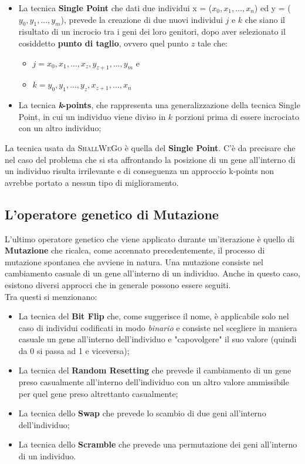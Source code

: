         \begin{itemize}
            \item La tecnica \textbf{Single Point} che dati due individui x = ($x_{0}, x_{1}, ..., x_{n}$) ed y = ($y_{0}, y_{1}, ..., y_{m}$), prevede la creazione di due nuovi individui $j$ e $k$ che siano il risultato di un incrocio tra i geni dei loro genitori, dopo aver selezionato il cosiddetto \textbf{punto di taglio}, ovvero quel punto $z$ tale che:
                \begin{itemize}
                    \item $j = x_{0}, x_{1}, ..., x_{z}, y_{z+1}, ..., y_{m}$ e
                    \item $k = y_{0}, y_{1}, ..., y_{z}, x_{z+1}, ..., x_{n}$
                \end{itemize}
            \item La tecnica \textbf{\textit{k}-points}, che rappresenta una generalizzazione della tecnica Single Point, in cui un individuo viene diviso in \textit{$k$} porzioni prima di essere incrociato con un altro individuo;
        \end{itemize}
        La tecnica usata da \textsc{ShallWeGo} è quella del \textbf{Single Point}. C'è da precisare che nel caso del problema che si sta affrontando la posizione di un gene all'interno di un individuo risulta irrilevante e di conseguenza un approccio k-points non avrebbe portato a nessun tipo di miglioramento.
    \subsection{L'operatore genetico di Mutazione}
        L'ultimo operatore genetico che viene applicato durante un'iterazione è quello di \textbf{Mutazione} che ricalca, come accennato precedentemente, il processo di mutazione spontanea che avviene in natura. Una mutazione consiste nel cambiamento casuale di un gene all'interno di un individuo. Anche in questo caso, esistono diversi approcci che in generale possono essere seguiti. \\
        Tra questi si menzionano:
        \begin{itemize}
            \item La tecnica del \textbf{Bit Flip} che, come suggerisce il nome, è applicabile solo nel caso di individui codificati in modo \textit{binario} e consiste nel scegliere in maniera casuale un gene all'interno dell'individuo e "capovolgere" il suo valore (quindi da 0 si passa ad 1 e viceversa);
            \item La tecnica del \textbf{Random Resetting} che prevede il cambiamento di un gene preso casualmente all'interno dell'individuo con un altro valore ammissibile per quel gene preso altrettanto casualmente;
            \item La tecnica dello \textbf{Swap} che prevede lo scambio di due geni all'interno dell'individuo;
            \item La tecnica dello \textbf{Scramble} che prevede una permutazione dei geni all'interno di un individuo.
        \end{itemize}

